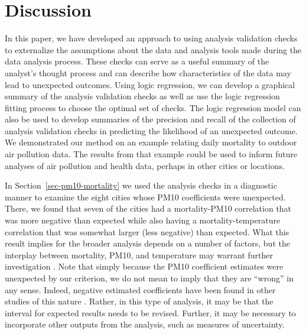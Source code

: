 \documentclass[
  12pt,
]{interact}
\begin{document}
\section{Discussion}\label{sec-discussion}

In this paper, we have developed an approach to using analysis
validation checks to externalize the assumptions about the data and
analysis tools made during the data analysis process. These checks can
serve as a useful summary of the analyst's thought process and can
describe how characteristics of the data may lead to unexpected
outcomes. Using logic regression, we can develop a graphical summary of
the analysis validation checks as well as use the logic regression
fitting process to choose the optimal set of checks. The logic
regression model can also be used to develop summaries of the precision
and recall of the collection of analysis validation checks in predicting
the likelihood of an unexpected outcome. We demonstrated our method on
an example relating daily mortality to outdoor air pollution data. The
results from that example could be used to inform future analyses of air
pollution and health data, perhaps in other cities or locations.

In Section~\ref{sec-pm10-mortality} we used the analysis checks in a
diagnostic manner to examine the eight cities whose PM10 coefficients
were unexpected. There, we found that seven of the cities had a
mortality-PM10 correlation that was more negative than expected while
also having a mortality-temperature correlation that was somewhat larger
(less negative) than expected. What this result implies for the broader
analysis depends on a number of factors, but the interplay between
mortality, PM10, and temperature may warrant further investigation
\citep[see e.g.][]{welty2005acute}. Note that simply because the PM10
coefficient estimates were unexpected by our criterion, we do not mean
to imply that they are ``wrong'' in any sense. Indeed, negative
estimated coefficients have been found in other studies of this nature
\citep{bell2004ozone}. Rather, in this type of analysis, it may be that
the interval for expected results needs to be revised. Further, it may
be necessary to incorporate other outputs from the analysis, such as
measures of uncertainty.
\end{document}
